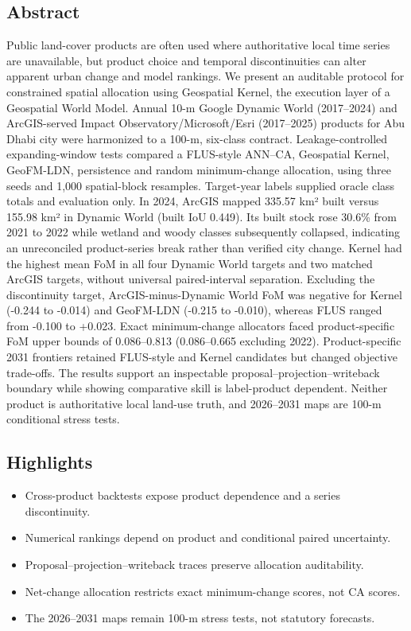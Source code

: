 \subsection{Abstract}\label{abstract}

Public land-cover products are often used where authoritative local time
series are unavailable, but product choice and temporal discontinuities
can alter apparent urban change and model rankings. We present an
auditable protocol for constrained spatial allocation using Geospatial
Kernel, the execution layer of a Geospatial World Model. Annual 10-m
Google Dynamic World (2017--2024) and ArcGIS-served Impact
Observatory/Microsoft/Esri (2017--2025) products for Abu Dhabi city were
harmonized to a 100-m, six-class contract. Leakage-controlled
expanding-window tests compared a FLUS-style ANN--CA, Geospatial Kernel,
GeoFM-LDN, persistence and random minimum-change allocation, using three
seeds and 1,000 spatial-block resamples. Target-year labels supplied
oracle class totals and evaluation only. In 2024, ArcGIS mapped 335.57
km² built versus 155.98 km² in Dynamic World (built IoU 0.449). Its
built stock rose 30.6\% from 2021 to 2022 while wetland and woody
classes subsequently collapsed, indicating an unreconciled
product-series break rather than verified city change. Kernel had the
highest mean FoM in all four Dynamic World targets and two matched
ArcGIS targets, without universal paired-interval separation. Excluding
the discontinuity target, ArcGIS-minus-Dynamic World FoM was negative
for Kernel (-0.244 to -0.014) and GeoFM-LDN (-0.215 to -0.010), whereas
FLUS ranged from -0.100 to +0.023. Exact minimum-change allocators faced
product-specific FoM upper bounds of 0.086--0.813 (0.086--0.665
excluding 2022). Product-specific 2031 frontiers retained FLUS-style and
Kernel candidates but changed objective trade-offs. The results support
an inspectable proposal--projection--writeback boundary while showing
comparative skill is label-product dependent. Neither product is
authoritative local land-use truth, and 2026--2031 maps are 100-m
conditional stress tests.

\subsection{Highlights}\label{highlights}

\begin{itemize}
\tightlist
\item
  Cross-product backtests expose product dependence and a series
  discontinuity.
\item
  Numerical rankings depend on product and conditional paired
  uncertainty.
\item
  Proposal--projection--writeback traces preserve allocation
  auditability.
\item
  Net-change allocation restricts exact minimum-change scores, not CA
  scores.
\item
  The 2026--2031 maps remain 100-m stress tests, not statutory
  forecasts.
\end{itemize}

